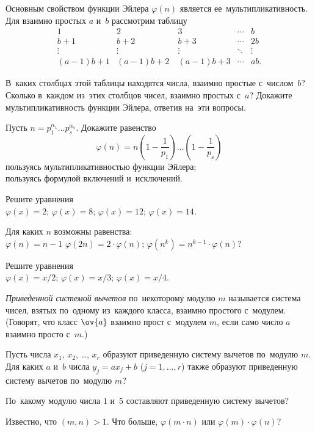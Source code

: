\begin{problems}

\item
Основным свойством функции Эйлера $\varphi(n)$ является ее~мультипликативность.
Для взаимно простых $a$ и~$b$ рассмотрим таблицу
\[ \begin{array}{ccccc}
    1 & 2 & 3 & \cdots & b
\\
    b + 1 & b + 2 & b + 3 & \cdots & 2 b
\\
    \vdots
    &
    \vdots
    &
    \vdots
    &
    \ddots
    &
    \vdots
\\
    (a - 1) b + 1 & (a - 1) b + 2 \ & (a - 1) b + 3 & \cdots & ab.
\end{array} \]

В~каких столбцах этой таблицы находятся числа, взаимно простые с~числом~$b$?
Сколько в~каждом из~этих столбцов чисел, взаимно простых с~$a$?
Докажите мультипликативность функции Эйлера, ответив на~эти вопросы.

\item
Пусть $n = p_1^{\alpha_1} \ldots p_s^{\alpha_s}$.
Докажите равенство
\[
    \varphi(n)
=
    n \left(
        1 - \frac{1}{p_1}
    \right)
    \ldots
    \left(
        1 - \frac{1}{p_s}
    \right)
\]
\sbp пользуясь мультипликативностью функции Эйлера;
\\
\sbp пользуясь формулой включений и~исключений.

\item
Решите уравнения
\\
\sbp $\varphi(x) = 2$;
\qquad
\sbp $\varphi(x) = 8$;
\qquad
\sbp $\varphi(x) = 12$;
\qquad
\sbp $\varphi(x) = 14$.

\item
Для каких $n$ возможны равенства:
\\
\sbp $\varphi(n) = n - 1$
\qquad
\sbp $\varphi(2 n) = 2 \cdot \varphi(n)$;
\qquad
\sbp $\varphi(n^k) = n^{k-1} \cdot \varphi(n)$?
 
\item
Решите уравнения
\\
\sbp $\varphi(x) = x / 2$;
\qquad
\sbp $\varphi(x) = x / 3$;
\qquad
\sbp $\varphi(x) = x / 4$.

\emph{Приведенной системой вычетов} по~некоторому модулю $m$ называется система
чисел, взятых по~одному из~каждого класса, взаимно простого с~модулем.
(Говорят, что класс $\ov{a}$ взаимно прост с~модулем $m$, если само число $a$
взаимно просто с~$m$.)

\item
Пусть числа $x_1$, $x_2$, \ldots, $x_r$ образуют приведенную систему вычетов
по~модулю $m$.
Для каких $a$ и~$b$ числа $y_j = a x_j + b$ ($j = 1, \ldots, r$) также образуют
приведенную систему вычетов по~модулю $m$?

\item
По~какому модулю числа $1$ и~$5$ составляют приведенную систему вычетов?

\item
Известно, что $(m, n) > 1$.
Что больше, $\varphi(m \cdot n)$ или $\varphi(m) \cdot \varphi(n)$?

\end{problems}

